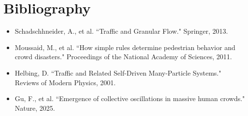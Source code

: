 \documentclass[10pt]{article}
\begin{document}
\section*{Bibliography}
\begin{itemize}
    \item Schadschhneider, A., et al. ``Traffic and Granular Flow." Springer, 2013.
    \item Moussaid, M., et al. ``How simple rules determine pedestrian behavior and crowd disasters." Proceedings of the National Academy of Sciences, 2011.
    \item Helbing, D. ``Traffic and Related Self-Driven Many-Particle Systems." Reviews of Modern Physics, 2001.
    \item Gu, F., et al. ``Emergence of collective oscillations in massive human crowds." Nature, 2025. 
\end{itemize}
\end{document}
